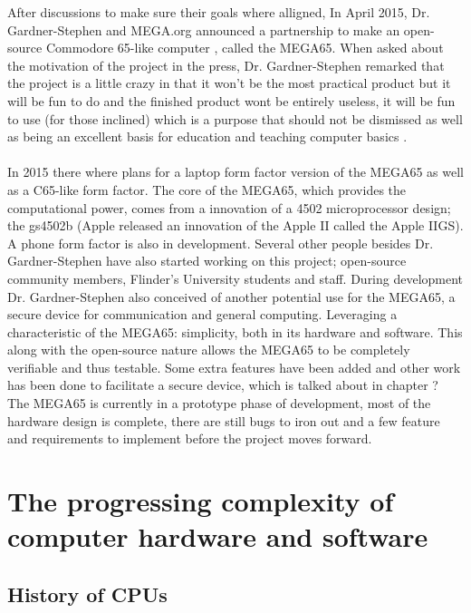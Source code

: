 After discussions to make sure their goals where alligned, In April 2015, Dr. Gardner-Stephen and MEGA.org announced a partnership to make an open-source Commodore 65-like computer \cite{megaintro}, called the MEGA65. When asked about the motivation of the project in the press, Dr. Gardner-Stephen remarked that the project is a little crazy in that it won't be the most practical product but it will be fun to do and the finished product wont be entirely useless, it will be fun to use (for those inclined) which is a purpose that should not be dismissed as well as being an excellent basis for education and teaching computer basics \cite{blogapril15}.  \\\\
In 2015 there where plans for a laptop form factor version of the MEGA65 as well as a C65-like form factor. The core of  the MEGA65, which provides the computational power, comes from a innovation of a 4502 microprocessor design; the gs4502b (Apple released an innovation of the Apple II called the Apple IIGS). A phone form factor is also in development. Several other people besides Dr. Gardner-Stephen have also started working on this project; open-source community members, Flinder's University students and staff. During development Dr. Gardner-Stephen also conceived of another potential use for the MEGA65, a secure device for communication and general computing. Leveraging a characteristic of the MEGA65: simplicity, both in its hardware and software. This along with the open-source nature allows the MEGA65 to be completely verifiable and thus testable. Some extra features have been added and other work has been done to facilitate a secure device, which is talked about in chapter ? The MEGA65 is currently in a prototype phase of development, most of the hardware design is complete, there are still bugs to iron out and a few feature and requirements to implement before the project moves forward. \\




\section{The progressing complexity of computer hardware and software}


\subsection{History of CPUs}


